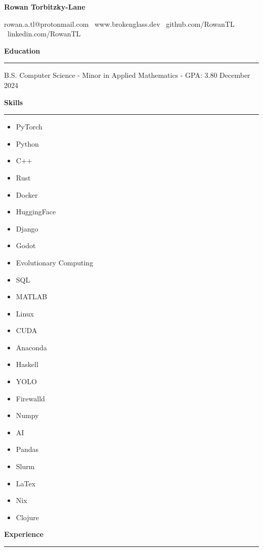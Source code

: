 \documentclass[11pt]{article}
\begin{document}
\begin{center}
    \textbf{\huge Rowan Torbitzky-Lane}\\
    \hrulefill
\end{center}

\begin{center}
    rowan.a.tl@protonmail.com \textbullet \ www.brokenglass.dev \textbullet \ github.com/RowanTL \textbullet  \ linkedin.com/RowanTL
\end{center}

\textbf{Education}\par
\vspace{-12pt}
\noindent\rule{\textwidth}{0.4pt}

B.S. Computer Science - Minor in Applied Mathematics - GPA: 3.80 \hfill December 2024

\textbf{Skills}\par
\vspace{-12pt}
\noindent\rule{\textwidth}{0.4pt}
\vspace{-24pt}  %
\begin{multicols}{3}
    \begin{itemize}[noitemsep, topsep=0pt, partopsep=0pt, parsep=0pt, itemsep=0pt]
        \small
        \item PyTorch
        \item Python
        \item C++
        \item Rust
        \item Docker
        \item HuggingFace
        \item Django
        \item Godot
        \item Evolutionary Computing
        \item SQL
        \item MATLAB
        \item Linux
        \item CUDA
        \item Anaconda
        \item Haskell
        \item YOLO
        \item Firewalld
        \item Numpy
        \item AI
        \item Pandas
        \item Slurm
        \item LaTex
        \item Nix
        \item Clojure
    \end{itemize}
\end{multicols}
\vspace{-10pt}  %
\textbf{Experience}\par
\vspace{-12pt}
\noindent\rule{\textwidth}{0.4pt}
\end{document}
